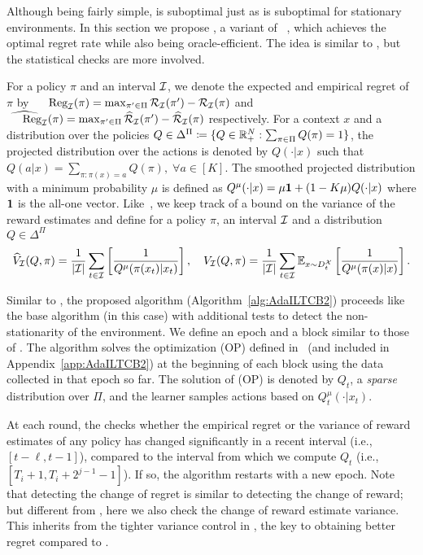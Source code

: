 Although being fairly simple, \AdaEG is suboptimal just as \EG is
suboptimal for stationary environments.  In this section we propose
\AdaILTCB, a variant of \minimonster~\citep{AgarwalHsKaLaLiSc14},
which achieves the optimal regret rate while also being
oracle-efficient.  The idea is similar to \AdaEG, but the statistical
checks are more involved.  

For a policy $\pi$ and an interval ${\mathcal{I}}$, we denote the expected and
empirical regret of $\pi$ by $\Reg_\calI(\pi) = \max_{\pi' \in
  \Pi}\calR_\calI(\pi') - \calR_\calI(\pi)$ and $\whReg_\calI(\pi) =
\max_{\pi' \in \Pi}\avgR_\calI(\pi')- \avgR_\calI(\pi)$ respectively.
For a context $x$ and a distribution over the policies $Q \in
\Delta^\Pi \coloneqq \{Q \in \mathbb{R}^N_+: \sum_{\pi \in \Pi} Q(\pi) =
1\}$, the projected distribution over the actions is denoted by
$Q(\cdot|x)$ such that $Q(a|x) = \sum_{\pi: \pi(x)=a} Q(\pi), \;
\forall a \in [K]$. The smoothed projected distribution with a minimum
probability $\mu$ is defined as $Q^\mu(\cdot|x) = \mu\boldsymbol{1} +
(1-K\mu)Q(\cdot|x)$ where $\boldsymbol{1}$ is the all-one
vector. Like~\citep{AgarwalHsKaLaLiSc14}, we keep track of a bound
on the variance of the reward estimates and define for a policy $\pi$, an
interval ${\mathcal{I}}$ and a distribution $Q \in \Delta^\Pi$
\[
\widehat{V}_{\mathcal{I}} (Q, \pi) = \frac{1}{|{\mathcal{I}}|} \sum_{t \in {\mathcal{I}}} \left[ \frac{1}{Q^{\mu}(\pi(x_t) | x_t)} \right], 
\quad V_{\mathcal{I}}(Q, \pi) = \frac{1}{|{\mathcal{I}}|} \sum_{t \in {\mathcal{I}}} \mathbb{E}_{x \sim D_t^{\mathcal{X}}} \left[ \frac{1}{Q^{\mu}(\pi(x) | x)} \right].
\]

Similar to \AdaEG, the proposed algorithm \AdaILTCB (Algorithm~\ref{alg:AdaILTCB2}) proceeds like the base algorithm (\sloppy \minimonster in this case) with additional tests to detect the non-stationarity of the environment. We define an epoch and a block similar to those of \AdaEG. The algorithm solves the optimization (OP) defined in~\citep{AgarwalHsKaLaLiSc14} (and included in
Appendix~\ref{app:AdaILTCB2}) at the beginning of each block using the data collected in that epoch so far. 
The solution of (OP) is denoted by $Q_t$, a \textit{sparse} distribution over $\Pi$, and the learner samples actions based on $Q_t^{\mu}(\cdot|x_t)$. 

At each round, the \test checks whether the empirical regret or the variance of reward estimates of any policy has changed significantly in a recent interval (i.e., $[t-\ell,t-1]$), compared to the interval from which we compute $Q_t$ (i.e., $[T_i+1, T_i+2^{j-1}-1]$). If so, the algorithm restarts with a new epoch. Note that detecting the change of regret is similar to detecting the change of reward; but different from \AdaEG, here we also check the change of reward estimate variance. This inherits from the tighter variance control in \minimonster, the key to obtaining better regret compared to \EPG. 

